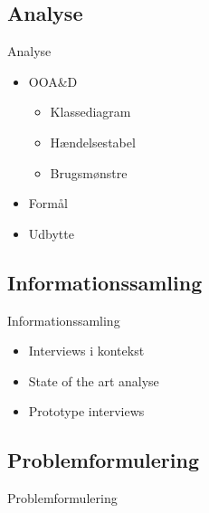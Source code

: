 \subsection{Analyse}
\begin{frame}{Analyse}
\begin{itemize}
   \item OOA\&D
   \begin{itemize}
      \item Klassediagram
      \item Hændelsestabel
      \item Brugsmønstre
   \end{itemize}
   \item Formål %
   \item Udbytte %
\end{itemize}
\end{frame}

\subsection{Informationssamling}
\begin{frame}{Informationssamling}
\begin{itemize}
   \item Interviews i kontekst
   \item State of the art analyse
   \item Prototype interviews
\end{itemize}
\end{frame}

\subsection{Problemformulering}
\begin{frame}{Problemformulering}
\end{frame}